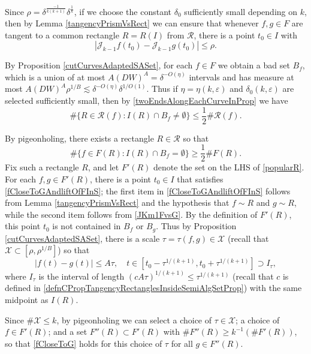 \documentclass[letterpaper, reqno,11pt]{article}
\numberwithin{equation}{section}
\newcommand{\eps}{\varepsilon}
\numberwithin{thm}{section}
\theoremstyle{remark}
\begin{document}
Since $\rho = \delta^{\frac{-1}{k(k+1)}}\delta^{\frac{1}{k}}$, if we choose the constant $\delta_0$ sufficiently small depending on $k$, then by Lemma \ref{tangencyPrismVsRect} we can ensure that whenever $f,g\in F$ are tangent to a common rectangle $R=R(I)$ from $\mathcal{R}$, there is a point $t_0\in I$ with 
\begin{equation}\label{JKm1FvsG}
|\mathcal{J}_{k-1}f(t_0) -  \mathcal{J}_{k-1}g(t_0)| \leq \rho.
\end{equation} 

By Proposition \ref{cutCurvesAdaptedSASet}, for each $f\in F$ we obtain a bad set $B_f$, which is a union of at most $A(DW)^A=\delta^{-O(\eta)}$ intervals and has measure at most $A (DW)^A \rho^{1/B}\lesssim \delta^{-O(\eta)} \delta^{1/O(1)}$. Thus if $\eta=\eta(k,\eps)$ and $\delta_0(k,\eps)$ are selected sufficiently small, then by \eqref{twoEndsAlongEachCurveInProp} we have
\begin{equation}\label{mostRectanglesGood}
 \# \{R\in\mathcal{R}(f) \colon I(R) \cap B_f\neq\emptyset \}\leq \frac{1}{2} \#\mathcal{R}(f).
\end{equation}

By pigeonholing, there exists a rectangle $R\in\mathcal{R}$ so that
\begin{equation}\label{popularR}
\#\{f\in F(R)\colon I(R) \cap B_f = \emptyset\} \geq \frac{1}{2}\#F(R).
\end{equation}
Fix such a rectangle $R$, and let $F'(R)$ denote the set on the LHS of \eqref{popularR}. For each $f,g\in F'(R)$, there is a point $t_0\in I$ that satisfies \eqref{fCloseToGAndliftOfFInS}; the first item in \eqref{fCloseToGAndliftOfFInS} follows from Lemma \ref{tangencyPrismVsRect} and the hypothesis that $f\sim R$ and $g\sim R$, while the second item follows from \eqref{JKm1FvsG}. By the definition of $F'(R)$, this point $t_0$ is not contained in $B_f$ or $B_g$. Thus by Proposition \ref{cutCurvesAdaptedSASet}, there is a scale $\tau=\tau(f,g)\in \mathcal{X}$ (recall that $\mathcal{X}\subset[\rho, \rho^{1/B}]$) so that
\begin{equation}\label{fCloseToG}
|f(t)-g(t)|\leq A \tau,\quad t\in [t_0-\tau^{1/(k+1)}, t_0+\tau^{1/(k+1)}]\supset I_\tau,
\end{equation}
where $I_\tau$ is the interval of length $(cA\tau)^{1/(k+1)}\leq \tau^{1/(k+1)}$ (recall that $c$ is defined in \eqref{defnCPropTangencyRectanglesInsideSemiAlgSetProp}) with the same midpoint as $I(R)$.

Since $\#\mathcal{X}\leq k$, by pigeonholing we can select a choice of $\tau\in \mathcal{X}$; a choice of $f\in F'(R)$; and a set $F''(R)\subset F'(R)$ with $\#F''(R)\geq k^{-1}(\#F'(R))$, so that \eqref{fCloseToG} holds for this choice of $\tau$ for all $g\in F''(R)$. 
\end{document}
